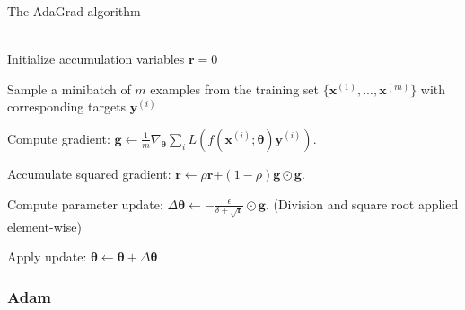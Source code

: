 \begin{algorithm}
\caption{The AdaGrad algorithm}\label{alg:AdaGrad}
\begin{algorithmic}
    \\
    Initialize accumulation variables $\boldsymbol{r}=0$
    

        Sample a minibatch of $m$ examples from the training set
        $\{\boldsymbol{x}^{(1)}, ..., \boldsymbol{x}^{(m)}\}$ with corresponding
        targets $\boldsymbol{y}^{(i)}$
    
        Compute gradient: $\boldsymbol{g} \gets
        \frac{1}{m}\nabla_{\boldsymbol\theta}
        \sum_{i}L(f(\boldsymbol{x}^{(i)};\boldsymbol{\theta})\boldsymbol{y}^{(i)})$.
        
        Accumulate squared gradient: $\boldsymbol{r} \gets
        \rho\boldsymbol{r}$+$(1-\rho)\boldsymbol{g}\odot\boldsymbol{g}$.

        Compute parameter update: 
        $\Delta\boldsymbol{\theta}\gets -\frac{\epsilon}{\delta+\sqrt{\boldsymbol{r}}}
        \odot\boldsymbol{g}$. (Division and square root applied element-wise)
    
        Apply update: $\boldsymbol{\theta}\gets
        \boldsymbol\theta+\Delta\boldsymbol\theta$
    \EndWhile
\end{algorithmic}
\end{algorithm}

\subsubsection{Adam}


